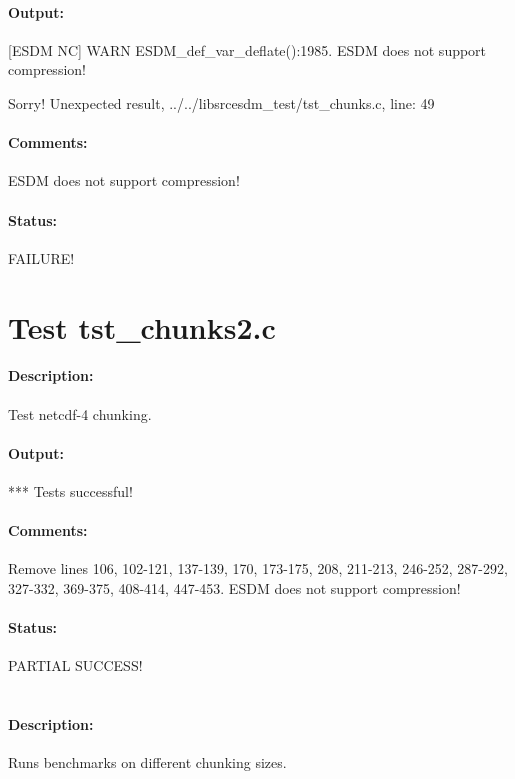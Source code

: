 \paragraph{Output:} [ESDM NC] WARN ESDM\_def\_var\_deflate():1985. ESDM does not support compression!

Sorry! Unexpected result, ../../libsrcesdm\_test/tst\_chunks.c, line: 49

\paragraph{Comments:} ESDM does not support compression!

\paragraph{Status:} FAILURE!

\section{Test tst\_chunks2.c}

\paragraph{Description:} Test netcdf-4 chunking.

\paragraph{Output:} *** Tests successful!

\paragraph{Comments:} Remove lines 106, 102-121, 137-139, 170, 173-175, 208, 211-213, 246-252, 287-292, 327-332, 369-375, 408-414, 447-453. ESDM does not support compression!

\paragraph{Status:} PARTIAL SUCCESS!

\section{{\color{blue}{FIX ME! Test tst\_chunks3.c}}}

\paragraph{Description:} Runs benchmarks on different chunking sizes.

